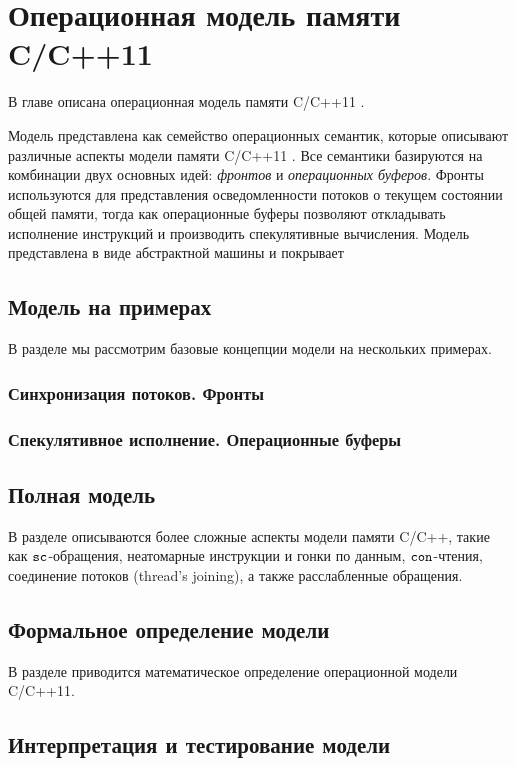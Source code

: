 \chapter{Операционная модель памяти C/C++11} \label{sec:opc11}
В главе описана операционная модель памяти C/C++11 \cite{Podkopaev-al:CoRR16}.


Модель представлена как семейство операционных семантик, которые описывают
различные аспекты модели памяти C/C++11 \cite{Batty-al:POPL11}.
Все семантики базируются на комбинации двух основных идей: 
\emph{фронтов} и \emph{операционных буферов}.
Фронты используются для представления осведомленности потоков о текущем состоянии общей памяти,
тогда как операционные буферы позволяют откладывать исполнение инструкций и
производить спекулятивные вычисления.
Модель представлена в виде абстрактной машины и покрывает 

\section{Модель на примерах}
В разделе мы рассмотрим базовые концепции модели на нескольких примерах.

\subsection{Синхронизация потоков. Фронты}
\subsection{Спекулятивное исполнение. Операционные буферы}

\section{Полная модель}
В разделе описываются более сложные аспекты модели памяти C/C++, такие как
${\mathtt{sc}}$-обращения, неатомарные инструкции и гонки по данным,
${\mathtt{con}}$-чтения, соединение потоков (thread's joining),
а также расслабленные обращения.

\section{Формальное определение модели}
В разделе приводится математическое определение операционной модели C/C++11.

\section{Интерпретация и тестирование модели}

